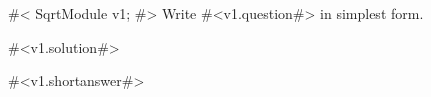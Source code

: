 

#<
SqrtModule v1;
#>
Write #<v1.question#> in simplest form.

#<v1.solution#>

#<v1.shortanswer#>


